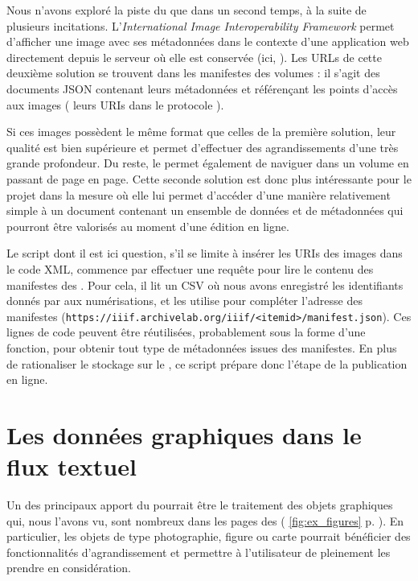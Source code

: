 Nous n'avons exploré la piste du \iiif{} que dans un second temps, à la suite de plusieurs incitations. L'\textit{International Image Interoperability Framework} permet d'afficher une image avec ses métadonnées dans le contexte d'une application web directement depuis le serveur où elle est conservée (ici, \ia). Les URLs de cette deuxième solution se trouvent dans les \og manifestes \iiif{} \fg{} des volumes : il s'agit des documents JSON contenant leurs métadonnées et référençant les points d'accès aux images (\cad{} leurs URIs dans le protocole \iiif).

Si ces images possèdent le même format que celles de la première solution, leur qualité est bien supérieure et permet d'effectuer des agrandissements d'une très grande profondeur. Du reste, le \iiif{} permet également de naviguer dans un volume en passant de page en page. Cette seconde solution est donc plus intéressante pour le projet \timeus{} dans la mesure où elle lui permet d'accéder d'une manière relativement simple à un document contenant un ensemble de données et de métadonnées qui pourront être valorisés au moment d'une édition en ligne.

Le script dont il est ici question, s'il se limite à insérer les URIs des images dans le code XML, commence par effectuer une requête pour lire le contenu des manifestes \iiif{} des \odm{}. Pour cela, il lit un CSV où nous avons enregistré les identifiants donnés par \ia{} aux numérisations, et les utilise pour compléter l'adresse des manifestes (\texttt{https://iiif.archivelab.org/iiif/<itemid>/manifest.json}). Ces lignes de code peuvent être réutilisées, probablement sous la forme d'une fonction, pour obtenir tout type de métadonnées issues des manifestes. En plus de rationaliser le stockage sur le \sharedocs{}, ce script prépare donc l'étape de la publication en ligne.

\section{Les données graphiques dans le flux textuel}

Un des principaux apport du \iiif{} pourrait être le traitement des objets graphiques qui, nous l'avons vu, sont nombreux dans les pages des \odm{} (\fig{} \ref{fig:ex_figures} p. \pageref{fig:ex_figures}). En particulier, les objets de type photographie, figure ou carte pourrait bénéficier des fonctionnalités d'agrandissement et permettre à l'utilisateur de pleinement les prendre en considération.

